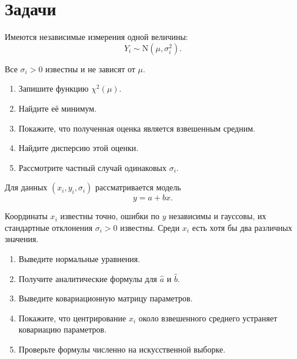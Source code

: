 \documentclass[
  russian,
  11pt,
  a4paper,
  open=any]{scrbook}
\providecommand{\tightlist}{%
  \setlength{\itemsep}{0pt}\setlength{\parskip}{0pt}}
\begin{document}
\section{Задачи}\label{ux437ux430ux434ux430ux447ux438-10}

\begin{semanticpdfbox}[colback=BookCoralSoft,borderline west={1.2mm}{0pt}{BookCoral}]

\par\nopagebreak[4]\vspace{1.2mm}

Имеются независимые измерения одной величины: \[
Y_i\sim\mathrm N(\mu,\sigma_i^2).
\]

Все \(\sigma_i>0\) известны и не зависят от \(\mu\).

\begin{enumerate}
\def\labelenumi{\arabic{enumi}.}
\tightlist
\item
  Запишите функцию \(\chi^2(\mu)\).
\item
  Найдите её минимум.
\item
  Покажите, что полученная оценка является взвешенным средним.
\item
  Найдите дисперсию этой оценки.
\item
  Рассмотрите частный случай одинаковых \(\sigma_i\).
\end{enumerate}

\end{semanticpdfbox}

\begin{semanticpdfbox}[colback=BookCoralSoft,borderline west={1.2mm}{0pt}{BookCoral}]

\par\nopagebreak[4]\vspace{1.2mm}

Для данных \((x_i,y_i,\sigma_i)\) рассматривается модель \[
y=a+bx.
\]

Координаты \(x_i\) известны точно, ошибки по \(y\) независимы и
гауссовы, их стандартные отклонения \(\sigma_i>0\) известны. Среди
\(x_i\) есть хотя бы два различных значения.

\begin{enumerate}
\def\labelenumi{\arabic{enumi}.}
\tightlist
\item
  Выведите нормальные уравнения.
\item
  Получите аналитические формулы для \(\widehat a\) и \(\widehat b\).
\item
  Выведите ковариационную матрицу параметров.
\item
  Покажите, что центрирование \(x_i\) около взвешенного среднего
  устраняет ковариацию параметров.
\item
  Проверьте формулы численно на искусственной выборке.
\end{enumerate}

\end{semanticpdfbox}
\end{document}
